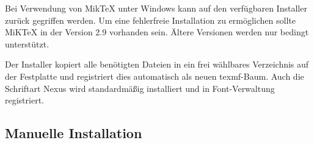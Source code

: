 Bei Verwendung von MikTeX unter Windows kann auf den verfügbaren Installer
zurück gegriffen werden. Um eine fehlerfreie Installation zu ermöglichen
sollte MiKTeX in der Version 2.9 vorhanden sein.
Ältere Versionen werden nur bedingt unterstützt.

Der Installer kopiert alle benötigten Dateien in ein frei wählbares Verzeichnis
auf der Festplatte und registriert dies automatisch als neuen texmf-Baum.
Auch die Schriftart Nexus wird standardmäßig installiert und in 
Font-Verwaltung registriert.




\subsection{Manuelle Installation}

